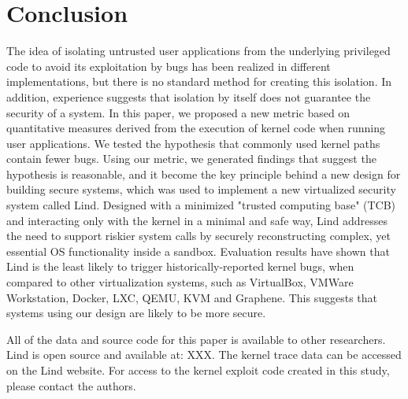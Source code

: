 \section{Conclusion}
\label{sec.conclusion}

The idea of isolating untrusted user applications from the underlying privileged code
to avoid its exploitation by bugs has been realized in different implementations,
but there is no standard method for creating this isolation.
In addition, experience suggests that isolation by itself does not guarantee the security of a system.
%
In this paper, we proposed a new metric based on quantitative measures derived from
the execution of kernel code when running user applications.
We tested the hypothesis that commonly used kernel paths contain fewer bugs.
Using our metric, we generated findings that suggest the hypothesis is reasonable,
 and it become the key principle behind a new design for building secure systems,
which was used to implement a new virtualized security system called Lind. Designed with a minimized
"trusted computing base" (TCB) and interacting only with the kernel in a minimal and safe
way, Lind addresses the need to support riskier system calls by securely
reconstructing complex, yet essential OS functionality inside a sandbox.
%
Evaluation results have shown that Lind is the least likely to trigger historically-reported kernel bugs,
when compared to other virtualization systems, such as VirtualBox, VMWare Workstation, Docker, LXC, 
QEMU, KVM and Graphene.
This suggests that systems using our design are likely to be more secure.

All of the data and source code for this paper is available to other
researchers.  Lind is open source and available at: XXX.  The kernel
trace data can be accessed on the Lind website.  For access
to the kernel exploit code created in this study, please contact the
authors.